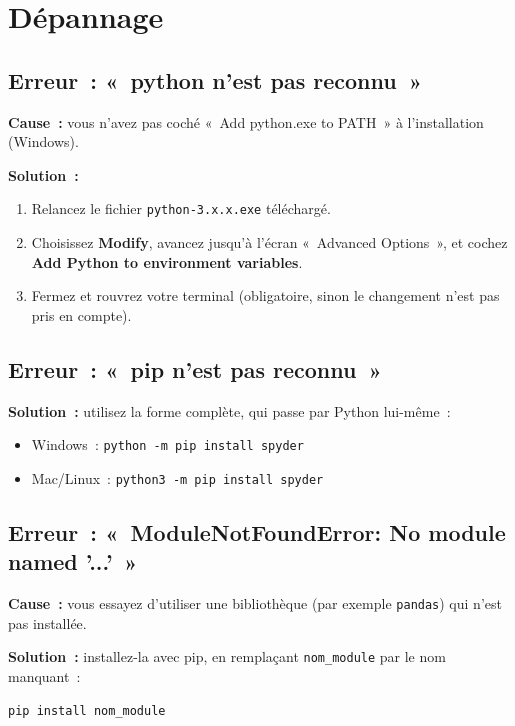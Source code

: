 \documentclass[12pt,a4paper]{article}
\begin{document}
	\section{Dépannage}
	
	\subsection{Erreur~: «~python n'est pas reconnu~»}
	
	\textbf{Cause~:} vous n'avez pas coché «~Add python.exe to PATH~» à l'installation (Windows).
	
	\textbf{Solution~:}
	\begin{enumerate}
		\item Relancez le fichier \texttt{python-3.x.x.exe} téléchargé.
		\item Choisissez \textbf{Modify}, avancez jusqu'à l'écran «~Advanced Options~», et cochez \textbf{Add Python to environment variables}.
		\item Fermez et rouvrez votre terminal (obligatoire, sinon le changement n'est pas pris en compte).
	\end{enumerate}
	
	\subsection{Erreur~: «~pip n'est pas reconnu~»}
	
	\textbf{Solution~:} utilisez la forme complète, qui passe par Python lui-même~:
	\begin{itemize}
		\item Windows~: \texttt{python -m pip install spyder}
		\item Mac/Linux~: \texttt{python3 -m pip install spyder}
	\end{itemize}
	
	\subsection{Erreur~: «~ModuleNotFoundError: No module named '...' \,»}
	
	\textbf{Cause~:} vous essayez d'utiliser une bibliothèque (par exemple \texttt{pandas}) qui n'est pas installée.
	
	\textbf{Solution~:} installez-la avec pip, en remplaçant \texttt{nom\_module} par le nom manquant~:
	\begin{lstlisting}[language=bash]
		pip install nom_module
	\end{lstlisting}
	
\end{document}
